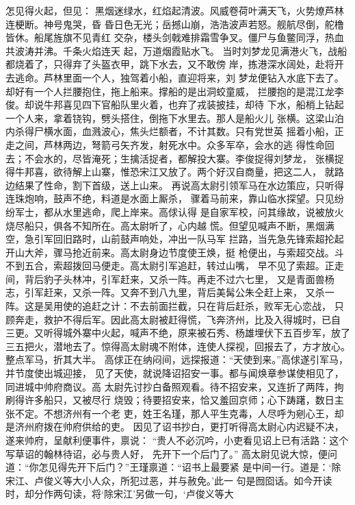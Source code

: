 怎见得火起，但见：
黑烟迷绿水，红焰起清波。风威卷荷叶满天飞，火势燎芦林连梗断。神号鬼哭，昏
昏日色无光；岳撼山崩，浩浩波声若怒。舰航尽倒，舵橹皆休。船尾旌旗不见青红
交杂，楼头剑戟难排霜雪争叉。僵尸与鱼鳖同浮，热血共波涛并沸。千条火焰连天
起，万道烟霞贴水飞。
当时刘梦龙见满港火飞，战船都烧着了，只得弃了头盔衣甲，跳下水去，又不敢傍
岸，拣港深水阔处，赴将开去逃命。芦林里面一个人，独驾着小船，直迎将来，刘
梦龙便钻入水底下去了。却好有一个人拦腰抱住，拖上船来。撑船的是出洞蛟童威，
拦腰抱的是混江龙李俊。却说牛邦喜见四下官船队里火着，也弃了戎装披挂，却待
下水，船梢上钻起一个人来，拿着铙钩，劈头搭住，倒拖下水里去。那人是船火儿
张横。这梁山泊内杀得尸横水面，血溅波心，焦头烂额者，不计其数。只有党世英
摇着小船，正走之间，芦林两边，弩箭弓矢齐发，射死水中。众多军卒，会水的逃
得性命回去；不会水的，尽皆淹死；生擒活捉者，都解投大寨。李俊捉得刘梦龙，
张横捉得牛邦喜，欲待解上山寨，惟恐宋江又放了。两个好汉自商量，把这二人，
就路边结果了性命，割下首级，送上山来。
再说高太尉引领军马在水边策应，只听得连珠炮响，鼓声不绝，料道是水面上厮杀，
骤着马前来，靠山临水探望。只见纷纷军士，都从水里逃命，爬上岸来。高俅认得
是自家军校，问其缘故，说被放火烧尽船只，俱各不知所在。高太尉听了，心内越
慌。但望见喊声不断，黑烟满空，急引军回旧路时，山前鼓声响处，冲出一队马军
拦路，当先急先锋索超抡起开山大斧，骤马抢近前来。高太尉身边节度使王焕，挺
枪便出，与索超交战。斗不到五合，索超拨回马便走。高太尉引军追赶，转过山嘴，
早不见了索超。正走间，背后豹子头林冲，引军赶来，又杀一阵。再走不过六七里，
又是青面兽杨志，引军赶来，又杀一阵。又奔不到八九里，背后美髯公朱仝赶上来，
又杀一阵。这是吴用使的追赶之计：不去前面拦截，只在背后赶杀，败军无心恋战，
只顾奔走，救护不得后军。因此高太尉被赶得慌，飞奔济州，比及入得城时，已自
三更。又听得城外寨中火起，喊声不绝，原来被石秀、杨雄埋伏下五百步军，放了
三五把火，潜地去了。惊得高太尉魂不附体，连使人探视，回报去了，方才放心。
整点军马，折其大半。
高俅正在纳闷间，远探报道：“天使到来。”高俅遂引军马，并节度使出城迎接，
见了天使，就说降诏招安一事。都与闻焕章参谋使相见了，同进城中帅府商议。高
太尉先讨抄白备照观看。待不招安来，又连折了两阵，拘刷得许多船只，又被尽行
烧毁；待要招安来，恰又羞回京师；心下踌躇，数日主张不定。不想济州有一个老
吏，姓王名瑾，那人平生克毒，人尽呼为剜心王，却是济州府拨在帅府供给的吏。
因见了诏书抄白，更打听得高太尉心内迟疑不决，遂来帅府，呈献利便事件，禀说：
“贵人不必沉吟，小吏看见诏上已有活路：这个写草诏的翰林待诏，必与贵人好，
先开下一个后门了。”
高太尉见说大惊，便问道：“你怎见得先开下后门？”王瑾禀道：“诏书上最要紧
是中间一行。道是：‘除宋江、卢俊义等大小人众，所犯过恶，并与赦免。’此一
句是囫囵话。如今开读时，却分作两句读，将‘除宋江’另做一句，‘卢俊义等大
